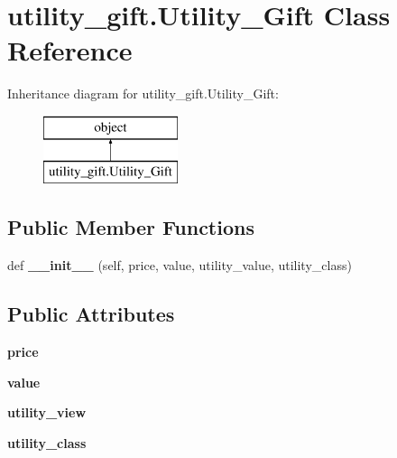 \hypertarget{classutility__gift_1_1_utility___gift}{}\section{utility\+\_\+gift.\+Utility\+\_\+\+Gift Class Reference}
\label{classutility__gift_1_1_utility___gift}
Inheritance diagram for utility\+\_\+gift.\+Utility\+\_\+\+Gift\+:\begin{figure}[H]
\begin{center}
\leavevmode
\includegraphics[height=2.000000cm]{classutility__gift_1_1_utility___gift}
\end{center}
\end{figure}
\subsection*{Public Member Functions}
\begin{DoxyCompactItemize}
\item 
\mbox{\label{classutility__gift_1_1_utility___gift_aa052e2d051b6ed87c8a1063994c6d625}} 
def {\bfseries \+\_\+\+\_\+init\+\_\+\+\_\+} (self, price, value, utility\+\_\+value, utility\+\_\+class)
\end{DoxyCompactItemize}
\subsection*{Public Attributes}
\begin{DoxyCompactItemize}
\item 
\mbox{\label{classutility__gift_1_1_utility___gift_a07cbe189b2d18ea5be913c1504494876}} 
{\bfseries price}
\item 
\mbox{\label{classutility__gift_1_1_utility___gift_ad6bfd57dd19981207c362567a99257f1}} 
{\bfseries value}
\item 
\mbox{\label{classutility__gift_1_1_utility___gift_a4e6bdcfbda7e752922e9e5a9a5589aeb}} 
{\bfseries utility\+\_\+view}
\item 
\mbox{\label{classutility__gift_1_1_utility___gift_a7e3112caebf026d3e0c583504e1f5a5c}} 
{\bfseries utility\+\_\+class}
\end{DoxyCompactItemize}


